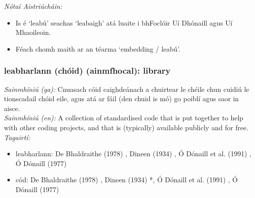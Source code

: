  \noindent \textit{Nótaí Aistriúcháin:}
\begin{itemize}
	\item Is é `leabú' seachas `leabaigh' atá luaite i bhFoclóir Uí Dhónaill agus Uí Mhaoileoin.
	\item Féach chomh maith ar an téarma `embedding / leabú'.
\end{itemize}


\subsubsection*{leabharlann (chóid) (ainmfhocal): library}
 \noindent \textit{Sainmhíniú (ga):} Cnuasach cóid caighdeánach a chuirtear le chéile chun cuidiú le tionscadail chóid eile, agus atá ar fáil (den chuid is mó) go poiblí agus saor in aisce.
\\
 \noindent \textit{Sainmhíniú (en):} A collection of standardised code that is put together to help with other coding projects, and that is (typically) available publicly and for free.
\\
 \noindent \textit{Tagairtí:}
\begin{itemize}
	\item leabharlann: De Bhaldraithe (1978) \cite{de-bhaldraithe}, Dineen (1934) \cite{dineen}, Ó Dónaill et al. (1991) \cite{focloir-beag}, Ó Dónaill (1977) \cite{odonaill}
	\item cód: De Bhaldraithe (1978) \cite{de-bhaldraithe}, Dineen (1934) \cite{dineen}*, Ó Dónaill et al. (1991) \cite{focloir-beag}, Ó Dónaill (1977) \cite{odonaill}
\end{itemize}

